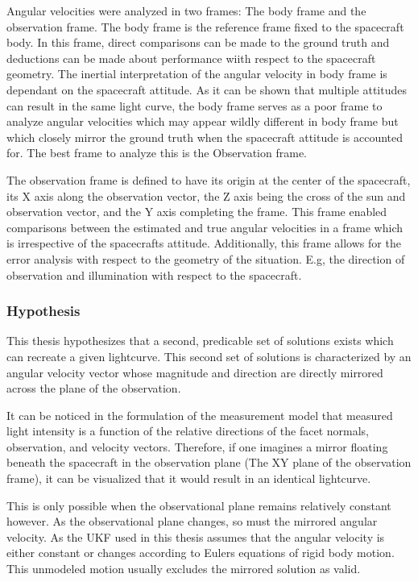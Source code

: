 Angular velocities were analyzed in two frames: The body frame and the observation frame. The body frame is the reference frame fixed to the spacecraft body. In this frame, direct comparisons can be made to the ground truth and deductions can be made about performance wiith respect to the spacecraft geometry. The inertial interpretation of the angular velocity in body frame is dependant on the spacecraft attitude. As it can be shown that multiple attitudes can result in the same light curve, the body frame serves as a poor frame to analyze angular velocities which may appear wildly different in body frame but which closely mirror the ground truth when the spacecraft attitude is accounted for. The best frame to analyze this is the Observation frame.


The observation frame is defined to have its origin at the center of the spacecraft, its X axis along the observation vector, the Z axis being the cross of the sun and observation vector, and the Y axis completing the frame. This frame enabled comparisons between the estimated and true angular velocities in a frame which is irrespective of the spacecrafts attitude. Additionally, this frame allows for the error analysis with respect to the geometry of the situation. E.g, the direction of observation and illumination with respect to the spacecraft.

\subsubsection{Hypothesis}

This thesis hypothesizes that a second, predicable set of solutions exists which can recreate a given lightcurve. This second set of solutions is characterized by an angular velocity vector whose magnitude and direction are directly mirrored across the plane of the observation.

It can be noticed in the formulation of the measurement model that measured light intensity is a function of the relative directions of the facet normals, observation, and velocity vectors. Therefore, if one imagines a mirror floating beneath the spacecraft in the observation plane (The XY plane of the observation frame), it can be visualized that it would result in an identical lightcurve.

This is only possible when the observational plane remains relatively constant however. As the observational plane changes, so must the mirrored angular velocity. As the UKF used in this thesis assumes that the angular velocity is either constant or changes according to Eulers equations of rigid body motion. This unmodeled motion usually excludes the mirrored solution as valid.


